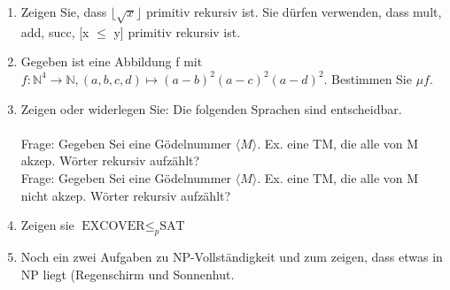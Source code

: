 \documentclass[11pt]{article}
\begin{document}
\begin{enumerate}
\item Zeigen Sie, dass $\lfloor \sqrt{x} \rfloor$ primitiv rekursiv ist. Sie dürfen verwenden,
dass mult, add, succ, [x $\leq$ y] primitiv rekursiv ist.

\item Gegeben ist eine Abbildung f mit $f: \mathbb{N}^4 \xrightarrow{} \mathbb{N}, (a,b,c,d) \mapsto (a-b)^2(a-c)^2(a-d)^2$. Bestimmen Sie $\mu f$.

\item Zeigen oder widerlegen Sie: Die folgenden Sprachen sind entscheidbar.\\\\
Frage: Gegeben Sei eine Gödelnummer $\langle M \rangle$. Ex. eine TM, die alle von M akzep. Wörter rekursiv aufzählt?
\\

Frage: Gegeben Sei eine Gödelnummer $\langle M \rangle$. Ex. eine TM, die alle von M nicht akzep. Wörter rekursiv aufzählt?

\item Zeigen sie $\text{EXCOVER} \leq_p \text{SAT}$

\item Noch ein zwei Aufgaben zu NP-Vollständigkeit und zum zeigen, dass etwas in NP liegt (Regenschirm und Sonnenhut.
\end{enumerate}
\end{document}
